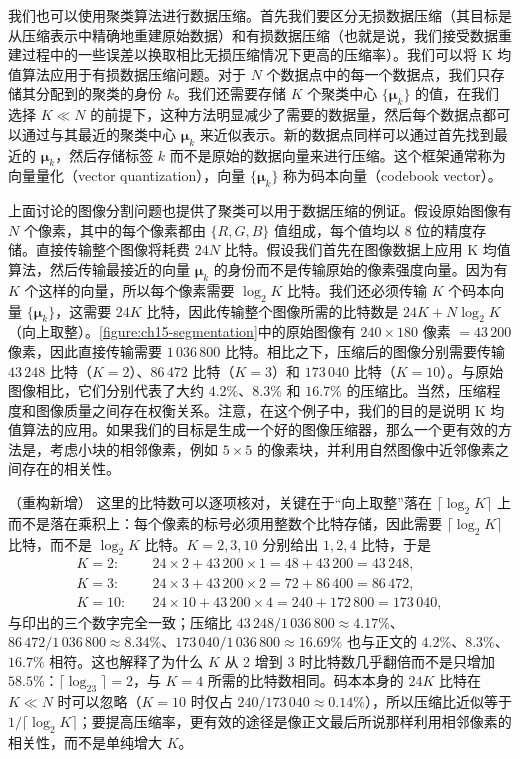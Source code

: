 \documentclass[../../main.tex]{subfiles}
\begin{document}
我们也可以使用聚类算法进行数据压缩。首先我们要区分无损数据压缩（其目标是从压缩表示中精确地重建原始数据）和有损数据压缩（也就是说，我们接受数据重建过程中的一些误差以换取相比无损压缩情况下更高的压缩率）。我们可以将 K 均值算法应用于有损数据压缩问题。对于 $N$ 个数据点中的每一个数据点，我们只存储其分配到的聚类的身份 $k$。我们还需要存储 $K$ 个聚类中心 $\{\bm{\mu}_k\}$ 的值，在我们选择 $K\ll N$ 的前提下，这种方法明显减少了需要的数据量，然后每个数据点都可以通过与其最近的聚类中心 $\bm{\mu}_k$ 来近似表示。新的数据点同样可以通过首先找到最近的 $\bm{\mu}_k$，然后存储标签 $k$ 而不是原始的数据向量来进行压缩。这个框架通常称为向量量化（vector quantization），向量 $\{\bm{\mu}_k\}$ 称为码本向量（codebook vector）。

\begin{example}[ 图像压缩的比特数计算]\label{example:ch15-图像压缩}
上面讨论的图像分割问题也提供了聚类可以用于数据压缩的例证。假设原始图像有 $N$ 个像素，其中的每个像素都由 $\{R,G,B\}$ 值组成，每个值均以 8 位的精度存储。直接传输整个图像将耗费 $24N$ 比特。假设我们首先在图像数据上应用 K 均值算法，然后传输最接近的向量 $\bm{\mu}_k$ 的身份而不是传输原始的像素强度向量。因为有 $K$ 个这样的向量，所以每个像素需要 $\log_2K$ 比特。我们还必须传输 $K$ 个码本向量 $\{\bm{\mu}_k\}$，这需要 $24K$ 比特，因此传输整个图像所需的比特数是 $24K+N\log_2K$（向上取整）。\cref{figure:ch15-segmentation}中的原始图像有 $240\times180$ 像素 $=43\,200$ 像素，因此直接传输需要 $1\,036\,800$ 比特。相比之下，压缩后的图像分别需要传输 $43\,248$ 比特（$K=2$）、$86\,472$ 比特（$K=3$）和 $173\,040$ 比特（$K=10$）。与原始图像相比，它们分别代表了大约 $4.2\%$、$8.3\%$ 和 $16.7\%$ 的压缩比。当然，压缩程度和图像质量之间存在权衡关系。注意，在这个例子中，我们的目的是说明 K 均值算法的应用。如果我们的目标是生成一个好的图像压缩器，那么一个更有效的方法是，考虑小块的相邻像素，例如 $5\times5$ 的像素块，并利用自然图像中近邻像素之间存在的相关性。
\end{example}

\begin{remark}（重构新增）
这里的比特数可以逐项核对，关键在于“向上取整”落在 $\lceil\log_2K\rceil$ 上而不是落在乘积上：每个像素的标号必须用整数个比特存储，因此需要 $\lceil\log_2K\rceil$ 比特，而不是 $\log_2K$ 比特。$K=2,3,10$ 分别给出 $1,2,4$ 比特，于是
\begin{align*}
K=2:&\quad 24\times2+43\,200\times1=48+43\,200=43\,248,\\
K=3:&\quad 24\times3+43\,200\times2=72+86\,400=86\,472,\\
K=10:&\quad 24\times10+43\,200\times4=240+172\,800=173\,040,
\end{align*}
与印出的三个数字完全一致；压缩比 $43\,248/1\,036\,800\approx4.17\%$、$86\,472/1\,036\,800\approx8.34\%$、$173\,040/1\,036\,800\approx16.69\%$ 也与正文的 $4.2\%$、$8.3\%$、$16.7\%$ 相符。这也解释了为什么 $K$ 从 2 增到 3 时比特数几乎翻倍而不是只增加 $58.5\%$：$\lceil\log_23\rceil=2$，与 $K=4$ 所需的比特数相同。码本本身的 $24K$ 比特在 $K\ll N$ 时可以忽略（$K=10$ 时仅占 $240/173\,040\approx0.14\%$），所以压缩比近似等于 $1/\lceil\log_2K\rceil$；要提高压缩率，更有效的途径是像正文最后所说那样利用相邻像素的相关性，而不是单纯增大 $K$。
\end{remark}
\end{document}
